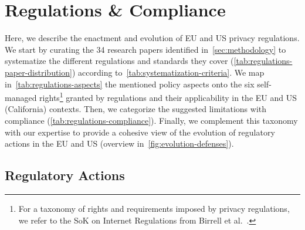 



\section{Regulations \& Compliance}
\label{sec:regulations}



Here, we describe the enactment and evolution of EU and US privacy regulations.
%
We start by curating the 34 research papers identified in~\autoref{sec:methodology} to systematize the different regulations and standards they cover (\autoref{tab:regulations-paper-distribution}) according to~\autoref{tab:systematization-criteria}.
%
We map in~\autoref{tab:regulations-aspects} the mentioned policy aspects onto the six self-managed rights\footnote{For a taxonomy of rights and requirements imposed by privacy regulations, we refer to the SoK on Internet Regulations from Birrell et al.~\cite{birrellSoKTechnicalImplementation2024}.} granted by regulations and their applicability in the EU and US (California) contexts.
%
Then, we categorize the suggested limitations with compliance (\autoref{tab:regulations-compliance}).
%
Finally, we complement this taxonomy with our expertise to provide a cohesive view of the evolution of regulatory actions in the EU and US (overview in~\autoref{fig:evolution-defenses}).


\subsection{Regulatory Actions}

